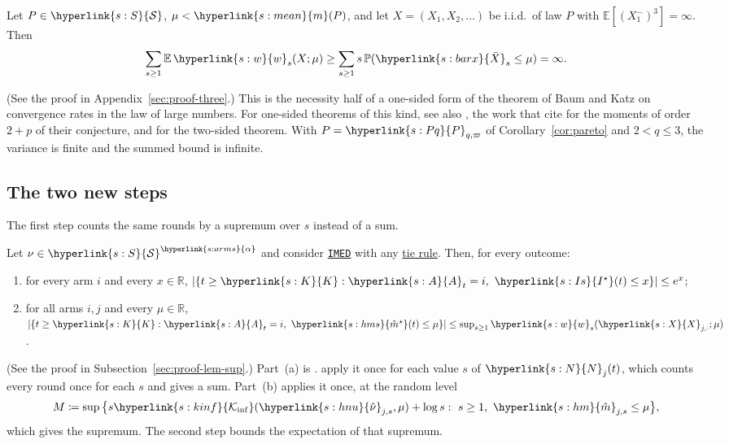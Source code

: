\documentclass[11pt]{article}
\newcommand{\E}{\mathbb{E}}
\newcommand{\Prob}{\mathbb{P}}
\newcommand{\R}{\mathbb{R}}
\newcommand{\sy}[2]{{\hyperlink{#1}{#2}}}
\newcommand{\term}[2]{\hyperlink{#1}{#2}}
\newcommand{\imed}{\hyperref[alg:imed]{\texttt{IMED}}}
\newcommand{\Sm}{\sy{s:S}{\mathcal{S}}}
\newcommand{\mean}{\sy{s:mean}{m}}
\newcommand{\arms}{\sy{s:arms}{\alpha}}
\newcommand{\Karms}{\sy{s:K}{K}}
\newcommand{\Kinf}{\sy{s:kinf}{\mathcal{K}_{\inf}}}
\newcommand{\bX}{\sy{s:barx}{\bar{X}}}
\newcommand{\Xs}{\sy{s:X}{X}}
\newcommand{\Ap}{\sy{s:A}{A}}
\newcommand{\Np}{\sy{s:N}{N}}
\newcommand{\hnu}{\sy{s:hnu}{\hat{\nu}}}
\newcommand{\hm}{\sy{s:hm}{\hat{m}}}
\newcommand{\hms}{\sy{s:hms}{\hat{m}^{\star}}}
\newcommand{\Is}{\sy{s:Is}{I^{\star}}}
\newcommand{\ws}{\sy{s:w}{w}}
\newcommand{\Pq}{\sy{s:Pq}{P}}
\begin{document}
\begin{lemma}\label{lem:three-moments}
Let $P\in\Sm$, $\mu<\mean(P)$, and let $X=(X_1,X_2,\dots)$ be i.i.d.\ of law $P$ with
$\E[(X_1^-)^3]=\infty$. Then
\[
  \sum_{s\ge1}\E\,\ws_s(X;\mu)\ge\sum_{s\ge1}s\,\Prob(\bX_s\le\mu)=\infty.
\]
\end{lemma}

(See the proof in Appendix~\ref{sec:proof-three}.) This is the necessity half of a one-sided form of
the theorem of Baum and Katz on convergence rates in the law of large numbers. For one-sided theorems
of this kind, see also \citet{CL75}, the work that \citet[Section~9]{HT15} cite for the moments of
order $2+p$ of their conjecture, and \citet{BK65} for the two-sided theorem. With
$P=\Pq_{q,\varpi}$ of Corollary~\ref{cor:pareto} and $2<q\le3$, the variance is finite and the summed
bound is infinite.


\subsection{The two new steps}\label{sec:overview-new}

The first step counts the same rounds by a supremum over $s$ instead of a sum.

\begin{lemma}\label{lem:sup}
Let $\nu\in\Sm^\arms$ and consider \imed{} with any \term{w:tie}{tie rule}. Then, for every outcome:
\begin{enumerate}[label=(\alph*)]
\item for every arm $i$ and every $x\in\R$,
  $|\{t\ge \Karms:\Ap_t=i,\ \Is(t)\le x\}|\le e^x$;
\item for all arms $i,j$ and every $\mu\in\R$,
  $|\{t\ge \Karms:\Ap_t=i,\ \hms(t)\le\mu\}|\le\sup_{s\ge1}\ws_s(\Xs_{j,\cdot};\mu)$.
\end{enumerate}
\end{lemma}

(See the proof in Subsection~\ref{sec:proof-lem-sup}.) Part~(a) is \citet[Lemma~13]{HT15}.
\citet{HT15} apply it once for each value $s$ of $\Np_j(t)$, which counts every round once for each $s$
and gives a sum. Part~(b) applies it once, at the random level
\begin{equation*}
  M\coloneqq\sup\big\{s\Kinf(\hnu_{j,s},\mu)+\log s:\ s\ge1,\ \hm_{j,s}\le\mu\big\},
\end{equation*}
which gives the supremum. The second step bounds the expectation of that supremum.
\end{document}
